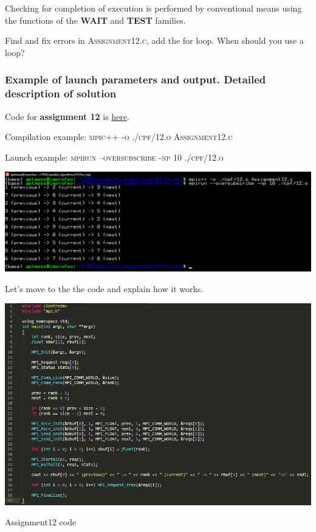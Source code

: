 \documentclass[%
12pt, %
final, %
oneside, %
onecolumn, %
centertags]{article} %
\theoremstyle{plain}
\theoremstyle{definition}
\theoremstyle{remark}
\begin{document}
Checking for completion of execution is performed by conventional means using the functions of the \textbf{WAIT} and \textbf{TEST} families.

Find and fix errors in \textsc{Assignment12.c}, add the for loop. When should you use a loop?


\subsubsection{Example of launch parameters and output. Detailed description of solution}

Code for \textbf{assignment 12} is \href{https:\//github.com/aptmess/parallel_algorithms/blob/master/HT/hw_mpi/Assignment12.c}{here}.

Compilation example: \textsc{mpic++ -o ./cpf/12.o Assignment12.c}

Launch example: \textsc{mpirun --oversubscribe -np 10 ./cpf/12.o}

\begin{center}
\includegraphics[scale=0.55]{12.png}
\end{center}

Let's move to the the code and explain how it works.

\begin{center}
\includegraphics[scale=0.8]{12.code.png}

Assignment12 code
\end{center}
\end{document}
